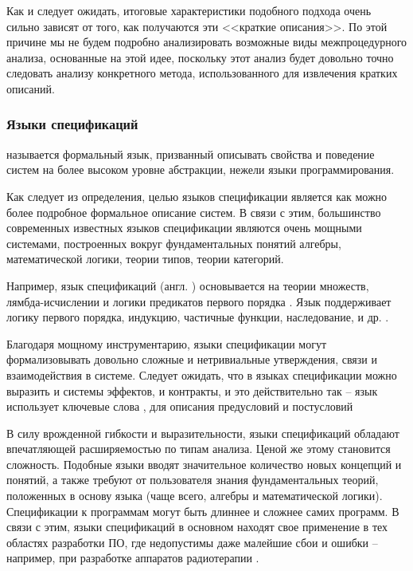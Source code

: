 Как и следует ожидать, итоговые характеристики подобного подхода очень сильно зависят от того, как получаются эти <<краткие описания>>. По этой причине мы не будем подробно анализировать возможные виды межпроцедурного анализа, основанные на этой идее, поскольку этот анализ будет довольно точно следовать анализу конкретного метода, использованного для извлечения кратких описаний.




\subsubsection{Языки спецификаций}

\begin{definition}
   называется формальный язык, призванный описывать свойства и поведение систем на более высоком уровне абстракции, нежели языки программирования.
\end{definition}

Как следует из определения, целью языков спецификации является как можно более подробное формальное описание систем. В связи с этим, большинство современных известных языков спецификации являются очень мощными системами, построенных вокруг фундаментальных понятий алгебры, математической логики, теории типов, теории категорий.

Например, язык спецификаций  (англ. ) основывается на теории множеств, лямбда-исчислении и логики предикатов первого порядка \cite{Z-notation}. Язык  поддерживает логику первого порядка, индукцию, частичные функции, наследование, и др. \cite{CASL}.

Благодаря мощному инструментарию, языки спецификации могут формализовывать довольно сложные и нетривиальные утверждения, связи и взаимодействия в системе. Следует ожидать, что в языках спецификации можно выразить и системы эффектов, и контракты, и это действительно так -- язык  использует ключевые слова ,  для описания предусловий и постусловий \cite{Larch}

В силу врожденной гибкости и выразительности, языки спецификаций обладают впечатляющей расширяемостью по типам анализа. Ценой же этому становится сложность. Подобные языки вводят значительное количество новых концепций и понятий, а также требуют от пользователя знания фундаментальных теорий, положенных в основу языка (чаще всего, алгебры и математической логики). Спецификации к программам могут быть длиннее и сложнее самих программ. В связи с этим, языки спецификаций в основном находят свое применение в тех областях разработки ПО, где недопустимы даже малейшие сбои и ошибки -- например, при разработке аппаратов радиотерапии \cite{Jacky97}.

